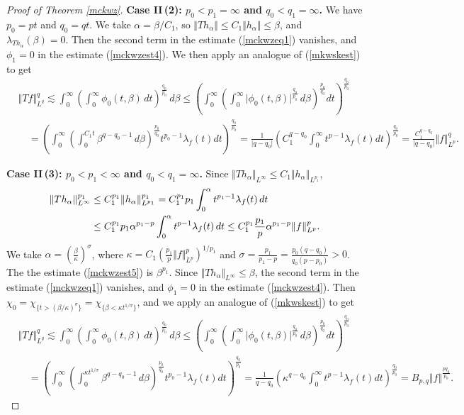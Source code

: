 \documentclass{article}
\numberwithin{equation}{section}
\theoremstyle{plain}
\theoremstyle{definition}
\begin{document}
\begin{proof}[Proof of Theorem \ref{mckwz}]
\item\textbf{Case II\,(2): $p_0<p_1=\infty$ and $q_0<q_1=\infty$.} We have $p_0=pt$ and $q_0=qt$. We take $\alpha=\beta/C_1$, so $\Vert Th_\alpha\Vert\leq C_1\Vert h_\alpha\Vert\leq\beta$, and $\lambda_{Th_\alpha}(\beta)=0$. Then the second term in the estimate (\ref{mckwzeq1}) vanishes, and $\phi_1=0$ in the estimate (\ref{mckwzest4}). We then apply an analogue of (\ref{mkwskest}) to get
\begin{align*}
	&\Vert Tf\Vert_{L^q}^q\lesssim\int_0^\infty\left(\int_0^\infty\phi_0(t,\beta)\,dt\right)^{\frac{q_0}{p_0}}\,d\beta\leq\left(\int_0^\infty\left(\int_0^\infty\vert\phi_0(t,\beta)\vert^{\frac{q_0}{p_0}}\,d\beta\right)^{\frac{p_0}{q_0}}dt\right)^{\frac{q_0}{p_0}}\\
	&\quad=\left(\int_0^\infty\left(\int_0^{C_1t}\beta^{q-q_0-1}\,d\beta\right)^{\frac{p_0}{q_0}}t^{p_0-1}\lambda_f(t)dt\right)^{\frac{q_0}{p_0}}=\frac{1}{\vert q-q_0\vert}\left(C_1^{q-q_0}\int_0^\infty t^{p-1}\lambda_f(t)dt\right)^{\frac{q_0}{p_0}}=\frac{C_1^{q-q_0}}{\vert q-q_0\vert}\Vert f\Vert_{L^p}^q.
\end{align*}

\item\textbf{Case II\,(3): $p_0<p_1<\infty$ and $q_0<q_1=\infty$.} Since $\Vert Th_\alpha\Vert_{L^\infty}\leq C_1\Vert h_\alpha\Vert_{L^{p_1}}$, 
\begin{align}
\Vert Th_\alpha\Vert_{L^\infty}^{p_1}&\leq C_1^{p_1}\Vert h_\alpha\Vert_{L^{p_1}}^{p_1}=C_1^{p_1}p_1\int_0^\alpha t^{p_1-1}\lambda_f(t)\,dt\notag\\
&\leq C_1^{p_1}p_1\alpha^{p_1-p}\int_0^\alpha t^{p-1}\lambda_f(t)\,dt\leq C_1^{p_1}\frac{p_1}{p}\alpha^{p_1-p}\Vert f\Vert_{L^p}^p.\label{mckwzest5}
\end{align}
We take $\alpha=(\frac{\beta}{\kappa})^\sigma$,
where $\kappa=C_1(\frac{p_1}{p}\Vert f\Vert_{L^p}^p)^{1/p_1}$ and $\sigma=\frac{p_1}{p_1-p}=\frac{p_0(q-q_0)}{q_0(p-p_0)}>0$. The the estimate (\ref{mckwzest5}) is $\beta^{p_1}$. Since $\Vert Th_\alpha\Vert_{L^\infty}\leq\beta$, the second term in the estimate (\ref{mckwzeq1}) vanishes, and $\phi_1=0$ in the estimate (\ref{mckwzest4}). Then $\chi_0=\chi_{\{t>(\beta/\kappa)^{\sigma}\}}=\chi_{\{\beta<\kappa t^{1/\sigma}\}}$, and we apply an analogue of (\ref{mkwskest}) to get
\begin{align*}
	&\Vert Tf\Vert_{L^q}^q\lesssim\int_0^\infty\left(\int_0^\infty\phi_0(t,\beta)\,dt\right)^{\frac{q_0}{p_0}}\,d\beta\leq\left(\int_0^\infty\left(\int_0^\infty\vert\phi_0(t,\beta)\vert^{\frac{q_0}{p_0}}\,d\beta\right)^{\frac{p_0}{q_0}}dt\right)^{\frac{q_0}{p_0}}\\
	&\quad=\left(\int_0^\infty\left(\int_0^{\kappa t^{1/\sigma}}\beta^{q-q_0-1}\,d\beta\right)^{\frac{p_0}{q_0}}t^{p_0-1}\lambda_f(t)dt\right)^{\frac{q_0}{p_0}}=\frac{1}{q-q_0}\left(\kappa^{q-q_0}\int_0^\infty t^{p-1}\lambda_f(t)dt\right)^{\frac{q_0}{p_0}}=B_{p,q}\Vert f\Vert^{\frac{pq_0}{p_0}}.
\end{align*}


\end{proof}
\end{document}
